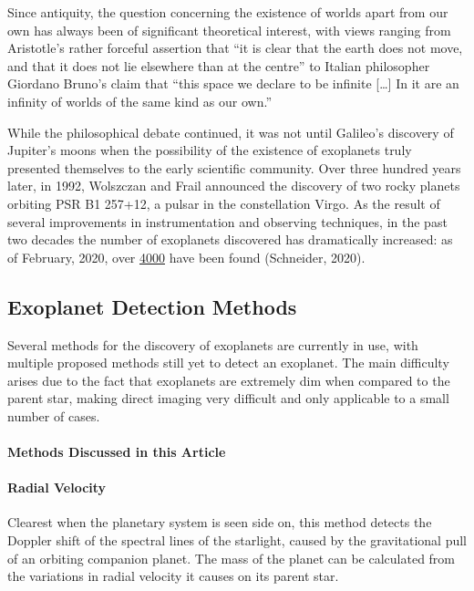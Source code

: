 \documentclass[11pt]{article}
\begin{document}
Since antiquity, the question concerning the existence of worlds apart
from our own has always been of significant theoretical interest, with
views ranging from Aristotle's rather forceful assertion that ``it is
clear that the earth does not move, and that it does not lie elsewhere
than at the centre'' to Italian philosopher Giordano Bruno's claim that
``this space we declare to be infinite {[}\ldots{]} In it are an
infinity of worlds of the same kind as our own.''

While the philosophical debate continued, it was not until Galileo's
discovery of Jupiter's moons when the possibility of the existence of
exoplanets truly presented themselves to the early scientific community.
Over three hundred years later, in 1992, Wolszczan and Frail announced
the discovery of two rocky planets orbiting PSR B1 257+12, a pulsar in
the constellation Virgo. As the result of several improvements in
instrumentation and observing techniques, in the past two decades the
number of exoplanets discovered has dramatically increased: as of
February, 2020, over \href{http://exoplanet.eu/catalog/}{4000} have been
found (Schneider, 2020).

    \hypertarget{exoplanet-detection-methods}{%
\subsection{Exoplanet Detection Methods}\label{exoplanet-detection-methods}}

Several methods for the discovery of exoplanets are currently in use,
with multiple proposed methods still yet to detect an exoplanet. The
main difficulty arises due to the fact that exoplanets are extremely dim
when compared to the parent star, making direct imaging very difficult
and only applicable to a small number of cases.

\hypertarget{methods-discussed-in-this-article}{%
\paragraph{Methods Discussed in this Article}\label{methods-discussed-in-this-article}}

\hypertarget{radial-velocity}{%
\paragraph{Radial Velocity}\label{radial-velocity}}

Clearest when the planetary system is seen side on, this method detects
the Doppler shift of the spectral lines of the starlight, caused by the
gravitational pull of an orbiting companion planet. The mass of the
planet can be calculated from the variations in radial velocity it
causes on its parent star.
\end{document}
